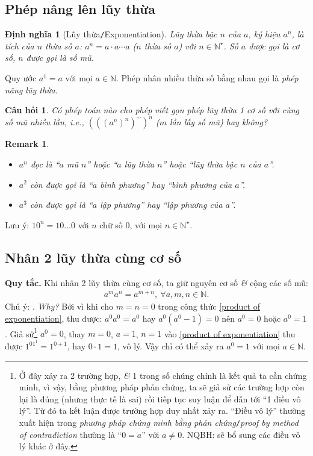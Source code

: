 \documentclass[oneside]{book}
\numberwithin{equation}{section}
\newtheorem{dinhnghia}{Định nghĩa}[section]
\newtheorem{cauhoi}{Câu hỏi}[section]
\newtheorem{remark}{Remark}[section]
\begin{document}
\subsection{Phép nâng lên lũy thừa}

\begin{dinhnghia}[Lũy thừa\texttt{/}Exponentiation]
	\emph{Lũy thừa bậc $n$} của $a$, ký hiệu $a^n$, là tích của $n$ thừa số $a$: $a^n = a\cdot a\cdots a$ ($n$ thừa số $a$) với $n\in\mathbb{N}^\star$. Số $a$ được gọi là \emph{cơ số}, $n$ được gọi là \emph{số mũ}.
\end{dinhnghia}
Quy ước $a^1 = a$ với mọi $a\in\mathbb{N}$. Phép nhân nhiều thừa số bằng nhau gọi là \textit{phép nâng lũy thừa}.

\begin{cauhoi}
	Có phép toán nào cho phép viết gọn phép lũy thừa 1 cơ số với cùng số mũ nhiều lần, i.e., $(((a^n)^n)^{\cdots})^n$ ($m$ lần lấy số mũ) hay không?
\end{cauhoi}

\begin{remark}
	\begin{itemize}
		\item $a^n$ đọc là ``$a$ mũ $n$'' hoặc ``$a$ lũy thừa $n$'' hoặc ``lũy thừa bậc $n$ của $a$''.
		\item $a^2$ còn được gọi là ``$a$ bình phương'' hay ``bình phương của $a$''.
		\item $a^3$ còn được gọi là ``$a$ lập phương'' hay ``lập phương của $a$''.
	\end{itemize}
\end{remark}
Lưu ý: $10^n = 10\ldots 0$ với $n$ chữ số 0, với mọi $n\in\mathbb{N}^\star$.

\subsection{Nhân 2 lũy thừa cùng cơ số}
\textbf{Quy tắc.} Khi nhân 2 lũy thừa cùng cơ số, ta giữ nguyên cơ số \textit{\&} cộng các số mũ:
\begin{align}
	\label{product of exponentiation}
	\boxed{a^ma^n = a^{m+n},\ \forall a,m,n\in\mathbb{N}.}
\end{align}
Chú ý: . \textit{Why?} Bởi vì khi cho $m = n = 0$ trong công thức \eqref{product of exponentiation}, thu được: $a^0a^0 = a^0$ hay $a^0(a^0 - 1) = 0$ nên $a^0 = 0$ hoặc $a^0 = 1$. Giả sử\footnote{Ở đây xảy ra 2 trường hợp, \textit{\&} 1 trong số chúng chính là kết quả ta cần chứng minh, vì vậy, bằng phương pháp phản chứng, ta sẽ giả sử các trường hợp còn lại là đúng (nhưng thực tế là sai) rồi tiếp tục suy luận để dẫn tới ``1 điều vô lý''. Từ đó ta kết luận được trường hợp duy nhất xảy ra. ``Điều vô lý'' thường xuất hiện trong \textit{phương pháp chứng minh bằng phản chứng}\texttt{/}\textit{proof by method of contradiction} thường là ``$0 = a$'' với $a\ne 0$. NQBH: sẽ bổ sung các điều vô lý khác ở đây.} $a^0 = 0$, thay $m = 0$, $a = 1$, $n = 1$ vào \eqref{product of exponentiation} thu được $1^01^1 = 1^{0+1}$, hay $0\cdot 1 = 1$, vô lý. Vậy chỉ có thể xảy ra $a^0 = 1$ với mọi $a\in\mathbb{N}$.
\end{document}
